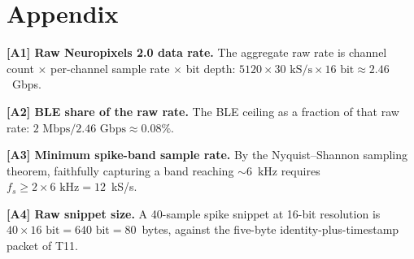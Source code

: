 \documentclass[11pt]{article}
\begin{document}
\section*{Appendix}

\noindent\textbf{[A1] Raw Neuropixels 2.0 data rate.} The aggregate raw rate is channel
count $\times$ per-channel sample rate $\times$ bit depth:
$5120 \times 30\text{~kS/s} \times 16\text{~bit} \approx 2.46$~Gbps.

\smallskip
\noindent\textbf{[A2] BLE share of the raw rate.} The BLE ceiling as a fraction of that raw
rate: $2\text{~Mbps} / 2.46\text{~Gbps} \approx 0.08\%$.

\smallskip
\noindent\textbf{[A3] Minimum spike-band sample rate.} By the Nyquist--Shannon sampling
theorem, faithfully capturing a band reaching $\sim$6~kHz requires
$f_s \geq 2 \times 6\text{~kHz} = 12$~kS/s.

\smallskip
\noindent\textbf{[A4] Raw snippet size.} A 40-sample spike snippet at 16-bit resolution is
$40 \times 16\text{~bit} = 640\text{~bit} = 80$~bytes, against the five-byte
identity-plus-timestamp packet of T11.
\end{document}
